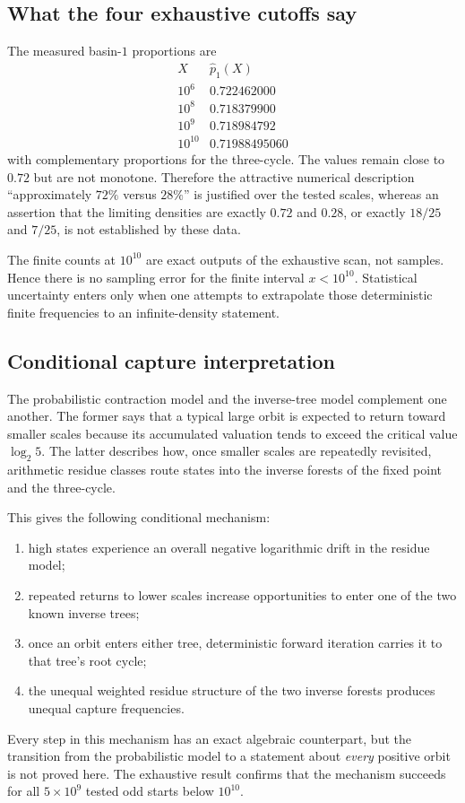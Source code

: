 \documentclass[11pt]{article}
\begin{document}
\subsection{What the four exhaustive cutoffs say}

The measured basin-$1$ proportions are
\[
\begin{array}{c|c}
X & \widehat p_1(X)\\ \hline
10^6 & 0.722462000\\
10^8 & 0.718379900\\
10^9 & 0.718984792\\
10^{10} & 0.71988495060
\end{array}
\]
with complementary proportions for the three-cycle.  The values remain close to $0.72$ but are not monotone.  Therefore the attractive numerical description ``approximately $72\%$ versus $28\%$'' is justified over the tested scales, whereas an assertion that the limiting densities are exactly $0.72$ and $0.28$, or exactly $18/25$ and $7/25$, is not established by these data.

The finite counts at $10^{10}$ are exact outputs of the exhaustive scan, not samples.  Hence there is no sampling error for the finite interval $x<10^{10}$.  Statistical uncertainty enters only when one attempts to extrapolate those deterministic finite frequencies to an infinite-density statement.

\subsection{Conditional capture interpretation}

The probabilistic contraction model and the inverse-tree model complement one another.  The former says that a typical large orbit is expected to return toward smaller scales because its accumulated valuation tends to exceed the critical value $\log_2 5$.  The latter describes how, once smaller scales are repeatedly revisited, arithmetic residue classes route states into the inverse forests of the fixed point and the three-cycle.

This gives the following conditional mechanism:
\begin{enumerate}
\item high states experience an overall negative logarithmic drift in the residue model;
\item repeated returns to lower scales increase opportunities to enter one of the two known inverse trees;
\item once an orbit enters either tree, deterministic forward iteration carries it to that tree's root cycle;
\item the unequal weighted residue structure of the two inverse forests produces unequal capture frequencies.
\end{enumerate}
Every step in this mechanism has an exact algebraic counterpart, but the transition from the probabilistic model to a statement about \emph{every} positive orbit is not proved here.  The exhaustive result confirms that the mechanism succeeds for all $5\times10^9$ tested odd starts below $10^{10}$.
\end{document}
